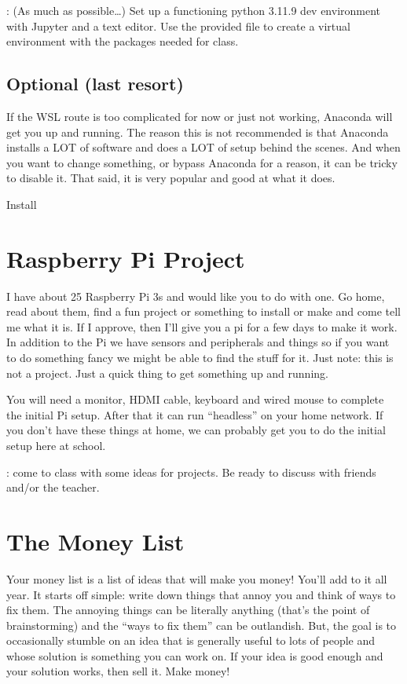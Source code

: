 \documentclass[letterpaper,10pt,english]{jupyterBook}
\begin{document}
\sphinxAtStartPar
{}: (As much as possible…) Set up a functioning python 3.11.9 dev environment with Jupyter and a text editor. Use the provided  file to create a virtual environment with the packages needed for class.


\subsection{Optional (last resort)}
\label{\detokenize{lessons/hw01:optional-last-resort}}
\sphinxAtStartPar
If the WSL route is too complicated for now or just not working, Anaconda will get you up
and running. The reason this is not recommended is that Anaconda installs a LOT of software and does a LOT of setup behind the scenes. And when you want to change something, or bypass Anaconda for a reason, it can be tricky to disable it. That said, it is very popular and good at what it does.

\sphinxAtStartPar
Install 


\section{Raspberry Pi Project}
\label{\detokenize{lessons/hw01:raspberry-pi-project}}
\sphinxAtStartPar
I have about 25 Raspberry Pi 3s and would like you to do  with one. Go home,
read about them, find a fun project or something to install or make and come tell me what
it is. If I approve, then I’ll give you a pi for a few days to make it work. In addition to the Pi we have sensors and peripherals and things so if you want to do something fancy we might be able to find the stuff for it. Just note: this is not a  project. Just a quick thing to get something up and running.

\sphinxAtStartPar
You will need a monitor, HDMI cable, keyboard and wired mouse to complete the initial Pi setup. After that it can run “headless” on your home network. If you don’t have these things at home, we can probably get you to do the initial setup here at school.

\sphinxAtStartPar
{}: come to class with some ideas for projects. Be ready to discuss with friends and/or the teacher.


\section{The Money List}
\label{\detokenize{lessons/hw01:the-money-list}}
\sphinxAtStartPar
Your money list is a list of ideas that will make you money! You’ll add to it all year. It starts off simple: write down things that annoy you and think of ways to fix them. The annoying things can be literally anything (that’s the point of brainstorming) and the “ways to fix them” can be outlandish. But, the goal is to occasionally stumble on an idea that is generally useful to lots of people and whose solution is something you can work on. If your idea is good enough and your solution works, then sell it. Make money!
\end{document}
